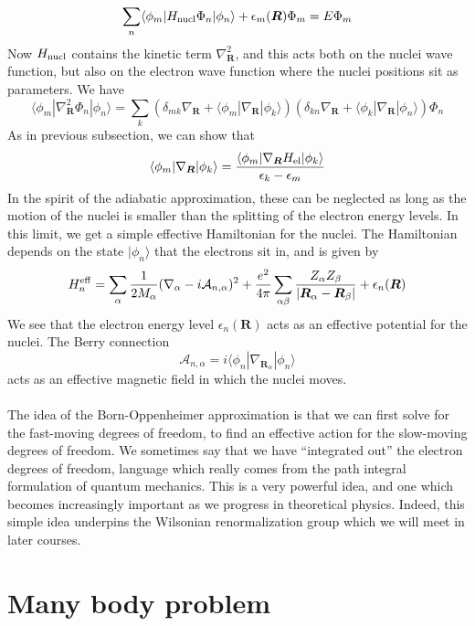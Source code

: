 \[\sum_n \langle \phi_m | H_{\rm nucl} \Phi_n | \phi_n \rangle + \epsilon_m(\bm{R}) \Phi_m = E\Phi_m\]
Now $H_{\rm nucl}$ contains the kinetic term $\nabla^2_{\bm{R}}$, and this acts both on the nuclei wave function, but also on the electron wave function where the nuclei positions sit as parameters. We have
\[\langle \phi_m | \nabla^2_{\bm{R}} \Phi_n | \phi_n \rangle = \sum_k \left(\delta_{mk} \nabla_{\bm{R}} + \langle \phi_m | \nabla_{\bm{R}} | \phi_k \rangle  \right) \left(\delta_{kn} \nabla_{\bm{R}} + \langle \phi_k | \nabla_{\bm{R}} | \phi_n \rangle  \right) \Phi_n\]
As in previous subsection, we can show that
\[\langle \phi_m | \nabla_{\bm{R}} | \phi_k \rangle = \frac{\langle \phi_m | \nabla_{\bm{R}} H_{\rm el} | \phi_k\rangle}{\epsilon_k - \epsilon_m}\]
In the spirit of the adiabatic approximation, these can be neglected as long as the motion of the nuclei is smaller than the splitting of the electron energy levels.
In this limit, we get a simple effective Hamiltonian for the nuclei. The Hamiltonian depends on the state $|\phi_n\rangle$ that the electrons sit in, and is given by
\[H_n^{\rm eff} = \sum_{\alpha} \frac{1}{2M_{\alpha}} (\nabla_{\alpha} - i\mathcal{A}_{n,\alpha})^2 + \frac{e^2}{4\pi}\sum_{\alpha \beta} \frac{Z_{\alpha} Z_{\beta}}{|\bm{R}_{\alpha} - \bm{R}_{\beta}|} + \epsilon_n(\bm{R}) \]
We see that the electron energy level $\epsilon_n(\bm{R})$ acts as an effective potential for the nuclei. The Berry connection
\[\mathcal{A}_{n,\alpha} = i \langle \phi_n | \nabla_{\bm{R}_{\alpha}} | \phi_n \rangle\]
acts as an effective magnetic field in which the nuclei
moves.
\\ \\
The idea of the Born-Oppenheimer approximation is that we can first solve for the fast-moving degrees of freedom, to find an effective action for the slow-moving degrees
of freedom. We sometimes say that we have ``integrated out'' the electron degrees of freedom, language which really comes from the path integral formulation of quantum mechanics. 
This is a very powerful idea, and one which becomes increasingly important as we progress in theoretical physics. Indeed, this simple idea underpins the Wilsonian
renormalization group which we will meet in later courses.

\chapter{Many body problem}
